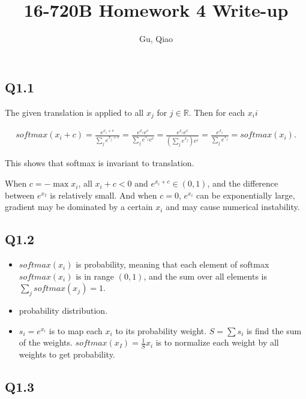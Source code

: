\documentclass[11pt]{article}
\begin{document}
\author{Gu, Qiao}
\title{16-720B Homework 4 Write-up}
\maketitle

\medskip

\subsection*{Q1.1}

The given translation is applied to all $x_j$ for $j\in \mathbb{R}$. Then for each $x_ii$

\begin{align}
  softmax(x_i+c) = \frac{e^{x_i+c}}{\sum_j e^{x_j+c}} = \frac{e^{x_i}e^c}{\sum_j e^{x_j}e^c}
  = \frac{e^{x_i}e^c}{(\sum_j e^{x_j})e^c} = \frac{e^{x_i}}{\sum_j e^{x_j}} = softmax(x_i).
\end{align}

This shows that softmax is invariant to translation.

When $c=-\max x_i$, all $x_i+c <0$ and $e^{x_i+c} \in (0,1)$, and the difference between $e^{x_I}$ is relatively small. And when $c=0$, $e^{x_i}$ can be exponentially large, gradient may be dominated by a certain $x_i$ and may cause numerical instability.

\newpage

\subsection*{Q1.2}

\begin{itemize}
  \item $softmax(x_i)$ is probability, meaning that each element of softmax $softmax(x_i)$ is in range $(0,1)$, and the sum over all elements is $\sum_j softmax(x_j) = 1$.
  \item probability distribution.
  \item $s_i=e^{x_i}$ is to map each $x_i$ to its probability weight. $S=\sum s_i$ is find the sum of the weights. $softmax(x_I) = \frac{1}{S} x_i$ is to normalize each weight by all weights to get probability.
\end{itemize}

\newpage

\subsection*{Q1.3}
\end{document}
